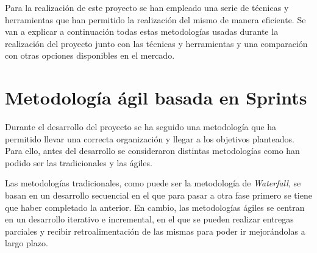 
Para la realización de este proyecto se han empleado una serie de técnicas y herramientas que han permitido la realización del mismo de manera eficiente. Se van a explicar a continuación todas estas metodologías usadas durante la realización del proyecto junto con las técnicas y herramientas y una comparación con otras opciones disponibles en el mercado.

\section{Metodología ágil basada en Sprints}
Durante el desarrollo del proyecto se ha seguido una metodología que ha permitido llevar una correcta organización y llegar a los objetivos planteados. Para ello, antes del desarrollo se consideraron distintas metodologías como han podido ser las tradicionales y las ágiles.

Las metodologías tradicionales, como puede ser la metodología de \textit{Waterfall}, se basan en un desarrollo secuencial en el que para pasar a otra fase primero se tiene que haber completado la anterior. En cambio, las metodologías ágiles se centran en un desarrollo iterativo e incremental, en el que se pueden realizar entregas parciales y recibir retroalimentación de las mismas para poder ir mejorándolas a largo plazo.

